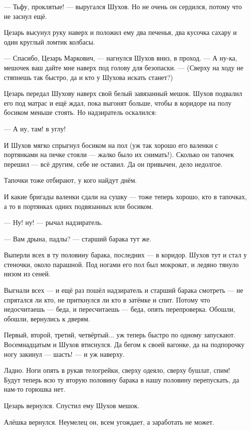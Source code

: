 --- Тьфу, проклятые! --- выругался Шухов. Но не очень он сердился, потому что не заснул ещё.

Цезарь высунул руку наверх и положил ему два печенья, два кусочка сахару и один круглый
ломтик колбасы.

--- Спасибо, Цезарь Маркович, --- нагнулся Шухов вниз, в проход. --- А ну-ка, мешочек ваш дайте мне
наверх под голову для безопаски. --- (Сверху на ходу не стяпнешь так быстро, да и кто у Шухова
искать станет?)

Цезарь передал Шухову наверх свой белый завязанный мешок. Шухов подвалил его под матрас и
ещё ждал, пока выгонят больше, чтобы в коридоре на полу босиком меньше стоять. Но надзиратель
оскалился:

--- А ну, там! в углу!

И Шухов мягко спрыгнул босиком на пол (уж так хорошо его валенки с портянками на печке стояли
--- жалко было их снимать!). Сколько он тапочек перешил --- всё другим, себе не оставил. Да он
привычен, дело недолгое.

Тапочки тоже отбирают, у кого найдут днём.

И какие бригады валенки сдали на сушку --- тоже теперь хорошо, кто в тапочках, а то в портянках
одних подвязанных или босиком.

--- Ну! ну! --- рычал надзиратель.

--- Вам дрына, падлы? --- старший барака тут же.

Выперли всех в ту половину барака, последних --- в коридор. Шухов тут и стал у стеночки, около
парашной. Под ногами его пол был мокроват, и ледяно тянуло низом из сеней.

Выгнали всех --- и ещё раз пошёл надзиратель и старший барака смотреть --- не спрятался ли кто,
не приткнулся ли кто в затёмке и спит. Потому что недосчитаешь --- беда, и пересчитаешь --- беда,
опять перепроверка. Обошли, обошли, вернулись к дверям.

Первый, второй, третий, четвёртый... уж теперь быстро по одному запускают. Восемнадцатым и
Шухов втиснулся. Да бегом к своей вагонке, да на подпорочку ногу закинул --- шасть! --- и уж
наверху.

Ладно. Ноги опять в рукав телогрейки, сверху одеяло, сверху бушлат, спим! Будут теперь всю ту
вторую половину барака в нашу половину перепускать, да нам-то горюшка нет.

Цезарь вернулся. Спустил ему Шухов мешок.

Алёшка вернулся. Неумелец он, всем угождает, а заработать не может.

